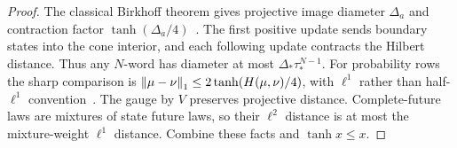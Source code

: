 \begin{proof}
The classical Birkhoff theorem gives projective image diameter $\Delta_a$ and contraction factor $\tanh(\Delta_a/4)$~\cite{cohen}. The first positive update sends boundary states into the cone interior, and each following update contracts the Hilbert distance. Thus any $N$-word has diameter at most $\Delta_*\tau_*^{N-1}$. For probability rows the sharp comparison is $\left\lVert\mu-\nu\right\rVert_1\le2\tanh(H(\mu,\nu)/4)$, with $\ell^1$ rather than half-$\ell^1$ convention~\cite{cohen}. The gauge by $V$ preserves projective distance. Complete-future laws are mixtures of state future laws, so their $\ell^2$ distance is at most the mixture-weight $\ell^1$ distance. Combine these facts and $\tanh x\le x$.
\end{proof}
